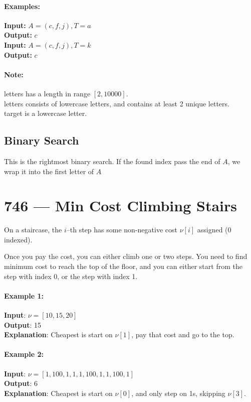 \paragraph{Examples:}
\begin{flushleft}
\textbf{Input:} $A=(c,f,j), T=a$
\\
\textbf{Output:} $c$
\\
\textbf{Input:} $A=(c,f,j), T=k$
\\
\textbf{Output:} $c$
\end{flushleft}
\paragraph{Note:}
\begin{flushleft}
letters has a length in range $[2, 10000]$.
\\
letters consists of lowercase letters, and contains at least 2 unique letters.
\\
target is a lowercase letter.
\end{flushleft}
\subsection{Binary Search}
This is the rightmost binary search. If the found index pass the end of $A$, we wrap it into the first letter of $A$


\section{746 --- Min Cost Climbing Stairs}
On a staircase, the $i$--th step has some non-negative cost $\nu[i]$ assigned (0 indexed).
\par
Once you pay the cost, you can either climb one or two steps. You need to find minimum cost to reach the top of the floor, and you can either start from the step with index 0, or the step with index 1.
\paragraph{Example 1:}
\begin{flushleft}
\textbf{Input}: $\nu = [10, 15, 20]$
\\
\textbf{Output}: 15
\\
\textbf{Explanation}: Cheapest is start on $\nu[1]$, pay that cost and go to the top.
\end{flushleft}
\paragraph{Example 2:}
\begin{flushleft}
\textbf{Input}: $\nu = [1, 100, 1, 1, 1, 100, 1, 1, 100, 1]$
\\
\textbf{Output}: 6
\\
\textbf{Explanation}: Cheapest is start on $\nu[0]$, and only step on 1s, skipping $\nu[3]$.
\end{flushleft}
